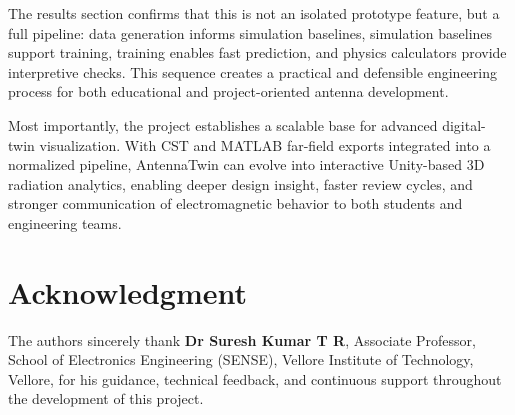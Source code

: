 \documentclass[12pt,a4paper]{article}
\begin{document}
The results section confirms that this is not an isolated prototype feature, but a full pipeline: data generation informs simulation baselines, simulation baselines support training, training enables fast prediction, and physics calculators provide interpretive checks. This sequence creates a practical and defensible engineering process for both educational and project-oriented antenna development.

Most importantly, the project establishes a scalable base for advanced digital-twin visualization. With CST and MATLAB far-field exports integrated into a normalized pipeline, AntennaTwin can evolve into interactive Unity-based 3D radiation analytics, enabling deeper design insight, faster review cycles, and stronger communication of electromagnetic behavior to both students and engineering teams.

\section*{Acknowledgment}
The authors sincerely thank \textbf{Dr Suresh Kumar T R}, Associate Professor, School of Electronics Engineering (SENSE), Vellore Institute of Technology, Vellore, for his guidance, technical feedback, and continuous support throughout the development of this project.
\end{document}
